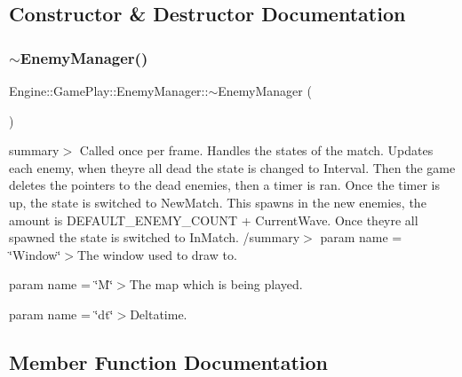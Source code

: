 \subsection{Constructor \& Destructor Documentation}
\mbox{\label{class_engine_1_1_game_play_1_1_enemy_manager_a503eadcd690205ae495d3761bdfdfcb6}} 
\subsubsection{\texorpdfstring{$\sim$\+Enemy\+Manager()}{~EnemyManager()}}
{\footnotesize\ttfamily Engine\+::\+Game\+Play\+::\+Enemy\+Manager\+::$\sim$\+Enemy\+Manager (\begin{DoxyParamCaption}{ }\end{DoxyParamCaption})}

summary$>$ Called once per frame. Handles the states of the match. Updates each enemy, when they\textquotesingle{}re all dead the state is changed to Interval. Then the game deletes the pointers to the dead enemies, then a timer is ran. Once the timer is up, the state is switched to New\+Match. This spawns in the new enemies, the amount is D\+E\+F\+A\+U\+L\+T\+\_\+\+E\+N\+E\+M\+Y\+\_\+\+C\+O\+U\+NT + Current\+Wave. Once they\textquotesingle{}re all spawned the state is switched to In\+Match. /summary$>$ param name = \char`\"{}\+Window\char`\"{}$>$The window used to draw to.

param name = \char`\"{}\+M\char`\"{}$>$The map which is being played.

param name = \char`\"{}dt\char`\"{}$>$Deltatime.

\subsection{Member Function Documentation}
\mbox{\label{class_engine_1_1_game_play_1_1_enemy_manager_a8feb401224cac44bec8b2d2c00b0910c}} 
